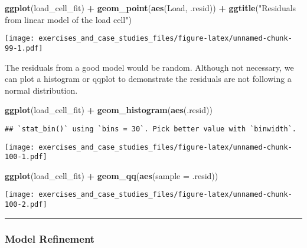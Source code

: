 \documentclass[]{book}
\newenvironment{Shaded}{\begin{snugshade}}{\end{snugshade}}
\newcommand{\DataTypeTok}[1]{\textcolor[rgb]{0.13,0.29,0.53}{#1}}
\newcommand{\KeywordTok}[1]{\textcolor[rgb]{0.13,0.29,0.53}{\textbf{#1}}}
\newcommand{\NormalTok}[1]{#1}
\newcommand{\OperatorTok}[1]{\textcolor[rgb]{0.81,0.36,0.00}{\textbf{#1}}}
\newcommand{\StringTok}[1]{\textcolor[rgb]{0.31,0.60,0.02}{#1}}
\theoremstyle{definition}
\theoremstyle{definition}
\theoremstyle{definition}
\theoremstyle{remark}
\begin{document}
\begin{Shaded}
\begin{Highlighting}[]
\KeywordTok{ggplot}\NormalTok{(load_cell_fit) }\OperatorTok{+}
\StringTok{  }\KeywordTok{geom_point}\NormalTok{(}\KeywordTok{aes}\NormalTok{(Load, .resid)) }\OperatorTok{+}
\StringTok{  }\KeywordTok{ggtitle}\NormalTok{(}\StringTok{"Residuals from linear model of the load cell"}\NormalTok{)}
\end{Highlighting}
\end{Shaded}

\texttt{[image: exercises\_and\_case\_studies\_files/figure-latex/unnamed-chunk-99-1.pdf]}

The residuals from a good model would be random. Although not necessary,
we can plot a histogram or qqplot to demonstrate the residuals are not
following a normal distribution.

\begin{Shaded}
\begin{Highlighting}[]
\KeywordTok{ggplot}\NormalTok{(load_cell_fit) }\OperatorTok{+}
\StringTok{  }\KeywordTok{geom_histogram}\NormalTok{(}\KeywordTok{aes}\NormalTok{(.resid))}
\end{Highlighting}
\end{Shaded}

\begin{verbatim}
## `stat_bin()` using `bins = 30`. Pick better value with `binwidth`.
\end{verbatim}

\texttt{[image: exercises\_and\_case\_studies\_files/figure-latex/unnamed-chunk-100-1.pdf]}

\begin{Shaded}
\begin{Highlighting}[]
\KeywordTok{ggplot}\NormalTok{(load_cell_fit) }\OperatorTok{+}
\StringTok{  }\KeywordTok{geom_qq}\NormalTok{(}\KeywordTok{aes}\NormalTok{(}\DataTypeTok{sample =}\NormalTok{ .resid))}
\end{Highlighting}
\end{Shaded}

\texttt{[image: exercises\_and\_case\_studies\_files/figure-latex/unnamed-chunk-100-2.pdf]}

\begin{center}\rule{0.5\linewidth}{\linethickness}\end{center}

\hypertarget{model-refinement}{%
\subsubsection{Model Refinement}\label{model-refinement}}
\end{document}
